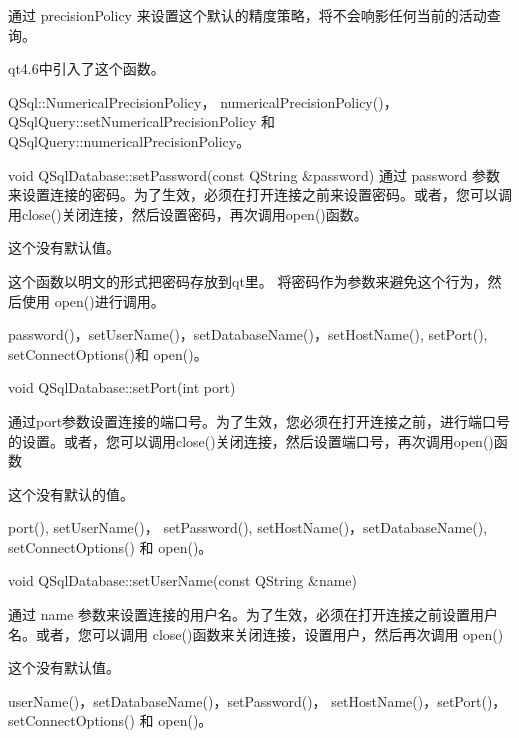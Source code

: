 \begin{notice}
通过 precisionPolicy 来设置这个默认的精度策略，将不会响影任何当前的活动查询。
\end{notice}

qt4.6中引入了这个函数。


\begin{seeAlso}
QSql::NumericalPrecisionPolicy，
numericalPrecisionPolicy()，QSqlQuery::setNumericalPrecisionPolicy 和 QSqlQuery::numericalPrecisionPolicy。
\end{seeAlso}



void QSqlDatabase::setPassword(const QString \&password)
通过 password 参数来设置连接的密码。为了生效，必须在打开连接之前来设置密码。或者，您可以调用close()关闭连接，然后设置密码，再次调用open()函数。

这个没有默认值。

\begin{warning}
这个函数以明文的形式把密码存放到qt里。 将密码作为参数来避免这个行为，然后使用 open()进行调用。
\end{warning}

\begin{seeAlso}
password()，setUserName()，setDatabaseName()，setHostName(),
setPort(), setConnectOptions()和 open()。
\end{seeAlso}

void QSqlDatabase::setPort(int port)

通过port参数设置连接的端口号。为了生效，您必须在打开连接之前，进行端口号的设置。或者，您可以调用close()关闭连接，然后设置端口号，再次调用open()函数

这个没有默认的值。

\begin{seeAlso}
port(), setUserName()， setPassword(),
setHostName()，setDatabaseName(), setConnectOptions() 和 open()。
\end{seeAlso}


void QSqlDatabase::setUserName(const QString \&name)

通过 name 参数来设置连接的用户名。为了生效，必须在打开连接之前设置用户名。或者，您可以调用 close()函数来关闭连接，设置用户，然后再次调用 open()

这个没有默认值。

\begin{seeAlso}
userName()，setDatabaseName()，setPassword()，
setHostName()，setPort()，setConnectOptions() 和 open()。
\end{seeAlso}

